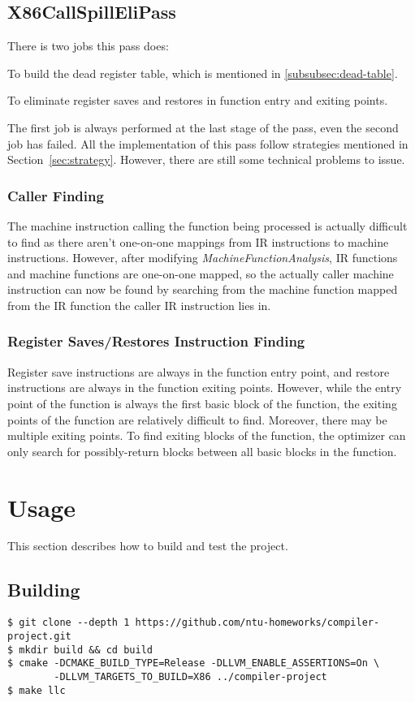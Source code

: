 \documentclass[acmsmall]{acmart}
\begin{document}
\subsection{X86CallSpillEliPass}
There is two jobs this pass does:
\begin{enumerate*}
	\item To build the dead register table, which is mentioned in \ref{subsubsec:dead-table}.
	\item To eliminate register saves and restores in function entry and exiting points.
\end{enumerate*}
The first job is always performed at the last stage of the pass, even the second job has failed. All the implementation of this pass follow strategies mentioned in Section~\ref{sec:strategy}. However, there are still some technical problems to issue.

\subsubsection{Caller Finding}
The machine instruction calling the function being processed is actually difficult to find as there aren't one-on-one mappings from IR instructions to machine instructions. However, after modifying \textit{MachineFunctionAnalysis}, IR functions and machine functions are one-on-one mapped, so the actually caller machine instruction can now be found by searching from the machine function mapped from the IR function the caller IR instruction lies in.

\subsubsection{Register Saves/Restores Instruction Finding}
Register save instructions are always in the function entry point, and restore instructions are always in the function exiting points. However, while the entry point of the function is always the first basic block of the function, the exiting points of the function are relatively difficult to find. Moreover, there may be multiple exiting points. To find exiting blocks of the function, the optimizer can only search for possibly-return blocks between all basic blocks in the function.

\section{Usage}
This section describes how to build and test the project.

\subsection{Building}
\begin{lstlisting}
$ git clone --depth 1 https://github.com/ntu-homeworks/compiler-project.git
$ mkdir build && cd build
$ cmake -DCMAKE_BUILD_TYPE=Release -DLLVM_ENABLE_ASSERTIONS=On \
        -DLLVM_TARGETS_TO_BUILD=X86 ../compiler-project
$ make llc
\end{lstlisting}
\end{document}
